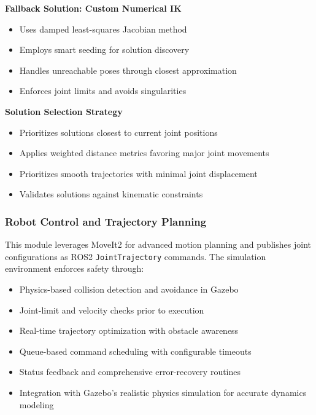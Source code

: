 \documentclass[conference]{IEEEtran}
\begin{document}
\textbf{Fallback Solution: Custom Numerical IK}
\begin{itemize}
    \item Uses damped least-squares Jacobian method
    \item Employs smart seeding for solution discovery
    \item Handles unreachable poses through closest approximation
    \item Enforces joint limits and avoids singularities
\end{itemize}

\textbf{Solution Selection Strategy}
\begin{itemize}
    \item Prioritizes solutions closest to current joint positions
    \item Applies weighted distance metrics favoring major joint movements
    \item Prioritizes smooth trajectories with minimal joint displacement
    \item Validates solutions against kinematic constraints
\end{itemize}

\subsubsection{Robot Control and Trajectory Planning}
This module leverages MoveIt2 for advanced motion planning and publishes joint configurations as ROS2 \texttt{JointTrajectory} commands. The simulation environment enforces safety through:
\begin{itemize}
    \item Physics-based collision detection and avoidance in Gazebo
    \item Joint-limit and velocity checks prior to execution
    \item Real-time trajectory optimization with obstacle awareness
    \item Queue-based command scheduling with configurable timeouts
    \item Status feedback and comprehensive error-recovery routines
    \item Integration with Gazebo's realistic physics simulation for accurate dynamics modeling
\end{itemize}
\end{document}
